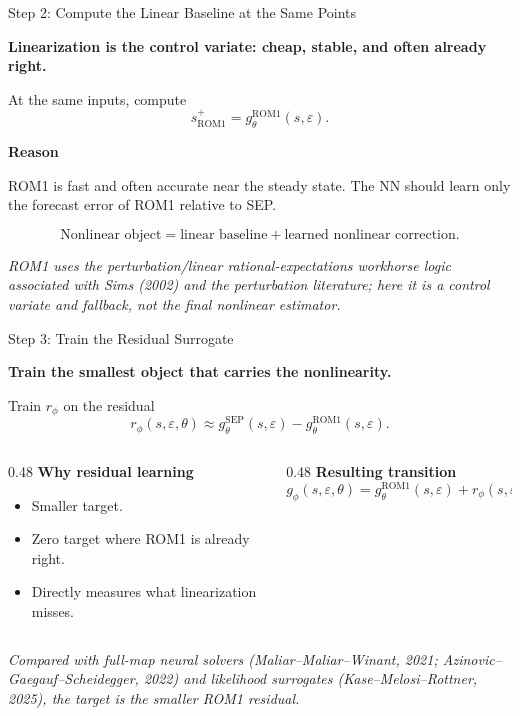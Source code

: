 \documentclass[aspectratio=169,10pt]{beamer}
\newcommand{\sep}{\mathrm{SEP}}
\newcommand{\rom}{\mathrm{ROM1}}
\newcommand{\eps}{\varepsilon}
\newcommand{\state}{s}
\newcommand{\sourcefoot}[1]{%
  \vspace{-0.55em}
  \begin{flushleft}
  \parbox{0.96\linewidth}{\raggedright\tiny\textit{#1}}
  \end{flushleft}
}
\newcommand{\claim}[1]{%
  \begin{center}
  \parbox{0.94\linewidth}{\centering\large\bfseries #1}
  \end{center}
}
\newcommand{\softline}{\par\vspace{0.12em}\noindent{\color{DeepBlue!45}\rule{0.88\linewidth}{0.45pt}}\par\vspace{0.25em}}
\begin{document}
\begin{frame}{Step 2: Compute the Linear Baseline at the Same Points}
\claim{Linearization is the control variate: cheap, stable, and often already right.}

\vspace{0.4em}
At the same inputs, compute
\[
  \state^+_{\rom} = g^{\rom}_{\theta}(\state,\eps).
\]

\vspace{0.4em}
\textbf{Reason}

\softline
ROM1 is fast and often accurate near the steady state. The NN should learn only
the forecast error of ROM1 relative to SEP.

\vspace{0.4em}
\begin{center}
\large
\[
  \text{Nonlinear object}
  =
  \text{linear baseline}
  +
  \text{learned nonlinear correction}.
\]
\end{center}
\sourcefoot{ROM1 uses the perturbation/linear rational-expectations workhorse logic associated with Sims (2002) and the perturbation literature; here it is a control variate and fallback, not the final nonlinear estimator.}
\end{frame}

\begin{frame}{Step 3: Train the Residual Surrogate}
\claim{Train the smallest object that carries the nonlinearity.}

\vspace{0.4em}
Train \(r_{\phi}\) on the residual
\[
  r_{\phi}(\state,\eps,\theta)
  \approx
  g^{\sep}_{\theta}(\state,\eps)
  -
  g^{\rom}_{\theta}(\state,\eps).
\]

\vspace{0.5em}
\begin{columns}[T,onlytextwidth]
\begin{column}{0.48\textwidth}
\textbf{Why residual learning}
\begin{itemize}
  \item Smaller target.
  \item Zero target where ROM1 is already right.
  \item Directly measures what linearization misses.
\end{itemize}
\end{column}
\begin{column}{0.48\textwidth}
\textbf{Resulting transition}
\[
  g_{\phi}(\state,\eps,\theta)
  =
  g^{\rom}_{\theta}(\state,\eps)
  +
  r_{\phi}(\state,\eps,\theta).
\]
\end{column}
\end{columns}
\sourcefoot{Compared with full-map neural solvers (Maliar--Maliar--Winant, 2021; Azinovic--Gaegauf--Scheidegger, 2022) and likelihood surrogates (Kase--Melosi--Rottner, 2025), the target is the smaller ROM1 residual.}
\end{frame}
\end{document}
